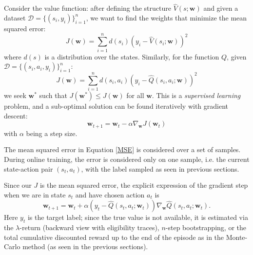\documentclass[10pt, a4paper]{report}
\begin{document}
Consider the value function: after defining the structure $\hat V(s;\mathbf w)$ and given a dataset $\mathcal D=\{(s_i,y_i)\}_{i=1}^n$, we want to find the weights that minimize the mean squared error:\begin{equation}
    J(\mathbf w)=\sum_{i=1}^n d(s_i)\left(
        y_i-\hat V(s_i;\mathbf w)
    \right)^2
\end{equation}
where $d(s)$ is a distribution over the states. Similarly, for the function $Q$, given $\mathcal D=\{(s_i,a_i,y_i)\}_{i=1}^n$:
    \begin{equation}\label{MSE}
    J(\mathbf w)=\sum_{i=1}^n d(s_i,a_i)\left(
        y_i-\hat Q(s_i,a_i;\mathbf w)
    \right)^2
\end{equation}
we seek $\mathbf w^*$ such that $J(\mathbf w^*)\le J(\mathbf w)$ for all $\mathbf w$. This is a \textit{supervised learning} problem, and a sub-optimal solution can be found iteratively with gradient descent:\begin{equation}
    \mathbf w_{t+1}=\mathbf w_t-\alpha\nabla_{\mathbf w}J(\mathbf w_t)
\end{equation}
with $\alpha$ being a step size.
\begin{boxobservation}{}{}
    The mean squared error in Equation \eqref{MSE} is considered over a set of samples. During online training, the error is considered only on one sample, i.e. the current state-action pair $(s_t,a_t)$, with the label sampled as seen in previous sections.
\end{boxobservation}
Since our $J$ is the mean squared error, the explicit expression of the gradient step when we are in state $s_t$ and have chosen action $a_t$ is\begin{equation}
    \mathbf w_{t+1}= \mathbf w_t+\alpha\left(
        y_t-\hat Q(s_t,a_t;\mathbf w_t)
    \right)\nabla_{\mathbf w}\hat Q(s_t,a_t;\mathbf w_t).
\end{equation}
Here $y_t$ is the target label; since the true value is not available, it is estimated via the $\lambda$-return (backward view with eligibility traces), $n$-step bootstrapping, or the total cumulative discounted reward up to the end of the episode as in the Monte-Carlo method (as seen in the previous sections).\bigskip 
\end{document}
